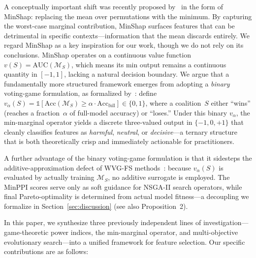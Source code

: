 \documentclass{article} %
\begin{document}
A conceptually important shift was recently proposed by~\citet{zheng2026minshap} in the form of MinShap: replacing the mean over permutations with the minimum. By capturing the worst-case marginal contribution, MinShap surfaces features that can be detrimental in specific contexts---information that the mean discards entirely. We regard MinShap as a key inspiration for our work, though we do not rely on its conclusions. MinShap operates on a continuous value function $v(S) = \text{AUC}(\mathcal{M}_S)$, which means its min output remains a continuous quantity in $[-1, 1]$, lacking a natural decision boundary. We argue that a fundamentally more structured framework emerges from adopting a {\em binary} voting-game formulation, as formalized by~\citet{owen1972multilinear}: define $v_\alpha(S) = \mathbb{1}[\text{Acc}(\mathcal{M}_S) \geq \alpha \cdot \text{Acc}_{\text{full}}] \in \{0,1\}$, where a coalition~$S$ either ``wins'' (reaches a fraction~$\alpha$ of full-model accuracy) or ``loses.'' Under this binary $v_\alpha$, the min-marginal operator yields a discrete three-valued output in $\{-1, 0, +1\}$ that cleanly classifies features as {\em harmful}, {\em neutral}, or {\em decisive}---a ternary structure that is both theoretically crisp and immediately actionable for practitioners.

A further advantage of the binary voting-game formulation is that it sidesteps the additive-approximation defect of WVG-FS methods~\citep{cohen2007feature}: because $v_\alpha(S)$ is evaluated by actually training $\mathcal{M}_S$, no additive surrogate is employed. The MinPPI scores serve only as soft guidance for NSGA-II search operators, while final Pareto-optimality is determined from actual model fitness---a decoupling we formalize in Section~\ref{sec:discussion} (see also Proposition~2).

In this paper, we synthesize three previously independent lines of investigation---game-theoretic power indices, the min-marginal operator, and multi-objective evolutionary search---into a unified framework for feature selection. Our specific contributions are as follows:
\end{document}
